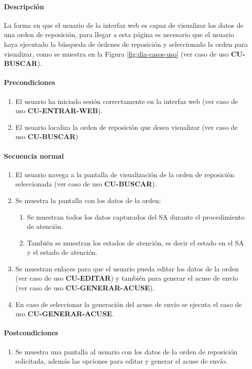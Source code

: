 \paragraph{Descripción}
La forma en que el usuario de la interfaz web es capaz de visualizar los datos de una orden de reposición, para llegar a esta página es necesario que el usuario haya ejecutado la búsqueda de órdenes de reposición y seleccionado la orden para visualizar, como se muestra en la Figura \ref{fig:dia-casos-uso} (ver caso de uso \textbf{CU-BUSCAR}).
\paragraph{Precondiciones}
\begin{enumerate}
  \item El usuario ha iniciado sesión correctamente en la interfaz web (ver caso de uso \textbf{CU-ENTRAR-WEB}).
  \item El usuario localiza la orden de reposición que desea visualizar (ver caso de uso \textbf{CU-BUSCAR})
\end{enumerate}
\paragraph{Secuencia normal}
\begin{enumerate}
  \item El usuario navega a la pantalla de visualización de la orden de reposición seleccionada (ver caso de uso \textbf{CU-BUSCAR}).
  \item Se muestra la pantalla con los datos de la orden:
  \begin{enumerate}
    \item Se muestran todos los datos capturados del SA durante el procedimiento de atención.
    \item También se muestran los estados de atención, es decir el estado en el SA  y el estado de atención.
  \end{enumerate}
  \item Se muestran enlaces para que el usuario pueda editar los datos de la orden (ver caso de uso \textbf{CU-EDITAR}) y también para generar el acuse de envío (ver caso de uso \textbf{CU-GENERAR-ACUSE}).
  \item En caso de seleccionar la generación del acuse de envío se ejecuta el caso de uso \textbf{CU-GENERAR-ACUSE}.
\end{enumerate}
\paragraph{Postcondiciones}
\begin{enumerate}
  \item Se muestra una pantalla al usuario con los datos de la orden de reposición solicitada, además las opciones para editar y generar el acuse de envío.
\end{enumerate}
